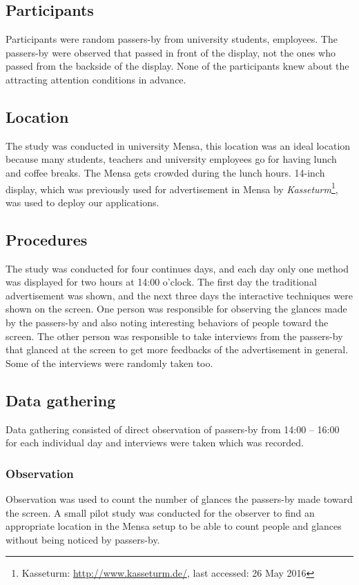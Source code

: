 \subsection{Participants}
Participants were random passers-by from university students, employees. The passers-by were observed that passed in front of the display, not the ones who passed from the backside of the display. None of the participants knew about the attracting attention conditions in advance.

\subsection{Location}
The study was conducted in university Mensa, this location was an ideal location because many students, teachers and university employees go for having lunch and coffee breaks. The Mensa gets crowded during the lunch hours. 14-inch display, which was previously used for advertisement in Mensa by \emph{Kasseturm}\footnote{Kasseturm: \url{http://www.kasseturm.de/}, last accessed: 26 May 2016}, was used to deploy our applications.


\subsection{Procedures}
The study was conducted for four continues days, and each day only one method was displayed for two hours at 14:00 o’clock. The first day the traditional advertisement was shown, and the next three days the interactive techniques were shown on the screen. One person was responsible for observing the glances made by the passers-by and also noting interesting behaviors of people toward the screen. The other person was responsible to take interviews from the passers-by that glanced at the screen to get more feedbacks of the advertisement in general. Some of the interviews were randomly taken too.

\subsection{Data gathering}
Data gathering consisted of direct observation of passers-by from 14:00 – 16:00 for each individual day and interviews were taken which was recorded. 

\subsubsection{Observation}
Observation was used to count the number of glances the passers-by made toward the screen. A small pilot study was conducted for the observer to find an appropriate location in the Mensa setup to be able to count people and glances without being noticed by passers-by.


